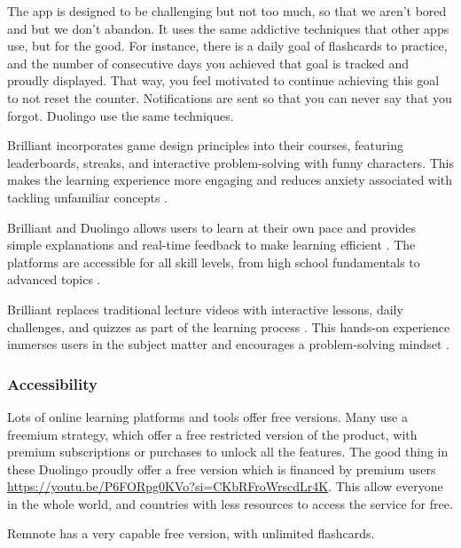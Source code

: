 \documentclass{article}
\begin{document}
The app is designed to be challenging but not too much, so that we aren't bored and but we don't abandon. It uses the same addictive techniques that other apps use, but for the good. For instance, there is a daily goal of flashcards to practice, and the number of consecutive days you achieved that goal is tracked and proudly displayed. That way, you feel motivated to continue achieving this goal to not reset the counter. Notifications are sent so that you can never say that you forgot.  Duolingo use the same techniques.

Brilliant incorporates game design principles into their courses, featuring leaderboards, streaks, and interactive problem-solving with funny characters. This makes the learning experience more engaging and reduces anxiety associated with tackling unfamiliar concepts \cite{https://fordhamram.com/2023/04/11/the-complete-brilliant.org-review}.

Brilliant and Duolingo allows users to learn at their own pace and provides simple explanations and real-time feedback to make learning efficient \cite{https://fordhamram.com/2023/04/11/the-complete-brilliant.org-review}. The platforms are accessible for all skill levels, from high school fundamentals to advanced topics \cite{https://fordhamram.com/2023/04/11/the-complete-brilliant.org-review}.

Brilliant replaces traditional lecture videos with interactive lessons, daily challenges, and quizzes as part of the learning process \cite{https://fordhamram.com/2023/04/11/the-complete-brilliant.org-review}. This hands-on experience immerses users in the subject matter and encourages a problem-solving mindset \cite{https://edwize.org/brilliant-org-review/}.

\subsubsection{Accessibility}
Lots of online learning platforms and tools offer free versions. Many use a freemium strategy, which offer a free restricted version of the product, with premium subscriptions or purchases to unlock all the features. The good thing in these Duolingo proudly offer a free version which is financed by premium users \url{https://youtu.be/P6FORpg0KVo?si=CKbRFroWrscdLr4K}. This allow everyone in the whole world, and countries with less resources to access the service for free.

Remnote has a very capable free version, with unlimited flashcards.
\end{document}

